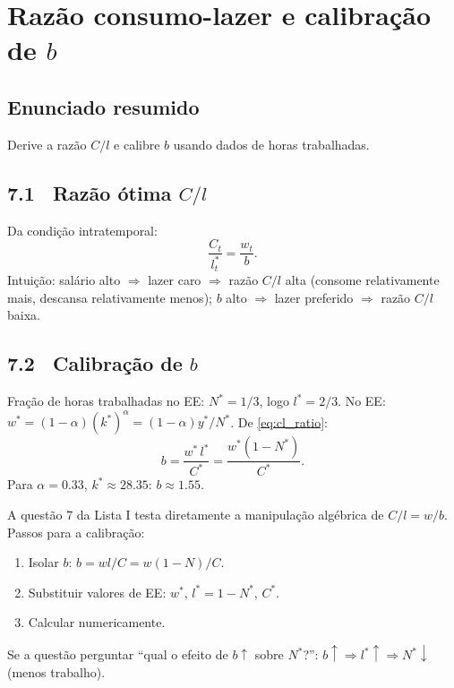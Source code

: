 \documentclass[12pt, a4paper]{article}
\newcommand{\kstar}{k^*}
\begin{document}
\section{Razão consumo-lazer e calibração de \texorpdfstring{$b$}{b}}

\subsection*{Enunciado resumido}
Derive a razão $C/l$ e calibre $b$ usando dados de horas trabalhadas.

\subsection*{7.1 \ Razão ótima \texorpdfstring{$C/l$}{C/l}}

Da condição intratemporal:
\begin{equation}
\frac{C_t}{l_t^*} = \frac{w_t}{b}.
\label{eq:cl_ratio}
\end{equation}
Intuição: salário alto $\Rightarrow$ lazer caro $\Rightarrow$ razão $C/l$ alta
(consome relativamente mais, descansa relativamente menos); $b$ alto $\Rightarrow$
lazer preferido $\Rightarrow$ razão $C/l$ baixa.

\subsection*{7.2 \ Calibração de \texorpdfstring{$b$}{b}}

Fração de horas trabalhadas no EE: $N^*=1/3$, logo $l^*=2/3$.
No EE: $w^* = (1-\alpha)(\kstar)^\alpha = (1-\alpha)y^*/N^*$.
De \eqref{eq:cl_ratio}:
\[
b = \frac{w^*\,l^*}{C^*} = \frac{w^*(1-N^*)}{C^*}.
\]
Para $\alpha=0.33$, $\kstar\approx 28.35$: $b\approx 1.55$.

\begin{provabox}[title={Atenção --- Cai na Prova (Q7)}]
A questão 7 da Lista I testa diretamente a manipulação algébrica de $C/l = w/b$.
Passos para a calibração:
\begin{enumerate}[leftmargin=1.5em, topsep=2pt, itemsep=2pt]
  \item Isolar $b$: $b = wl/C = w(1-N)/C$.
  \item Substituir valores de EE: $w^*$, $l^*=1-N^*$, $C^*$.
  \item Calcular numericamente.
\end{enumerate}
Se a questão perguntar ``qual o efeito de $b\uparrow$ sobre $N^*$?'':
$b\uparrow \Rightarrow l^*\uparrow \Rightarrow N^*\downarrow$ (menos trabalho).
\end{provabox}
\end{document}
